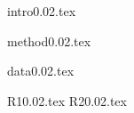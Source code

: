 \documentclass[useAMS,usenatbib]{mn2e}
\begin{document}
{intro0.02.tex}


{method0.02.tex}


{data0.02.tex}

{R10.02.tex}
{R20.02.tex}
\end{document}
